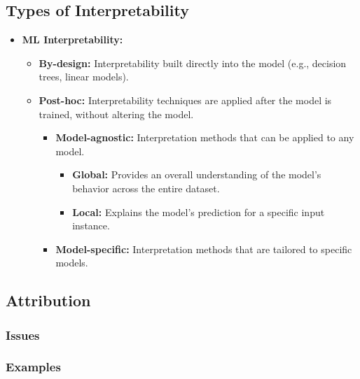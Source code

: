 \subsection{Types of Interpretability}
\begin{summary}
    \begin{itemize}
        \item \textbf{ML Interpretability:} 
        \begin{itemize}
            \item \textbf{By-design:} Interpretability built directly into the model (e.g., decision trees, linear models).
            \item \textbf{Post-hoc:} Interpretability techniques are applied after the model is trained, without altering the model.
            \begin{itemize}
                \item \textbf{Model-agnostic:} Interpretation methods that can be applied to any model.
                \begin{itemize}
                    \item \textbf{Global:} Provides an overall understanding of the model’s behavior across the entire dataset.
                    \item \textbf{Local:} Explains the model’s prediction for a specific input instance.
                \end{itemize}
                \item \textbf{Model-specific:} Interpretation methods that are tailored to specific models.
            \end{itemize}
        \end{itemize}
    \end{itemize}    
\end{summary}



\subsection{Attribution}

\subsubsection{Issues}



\subsubsection{Examples}
